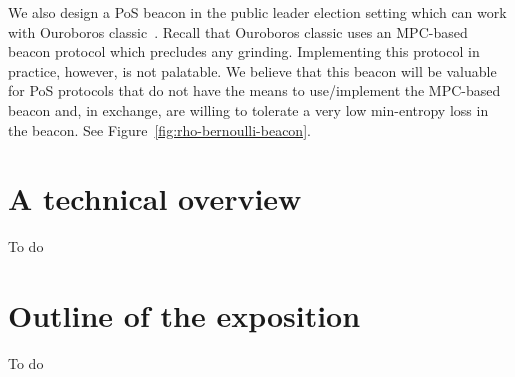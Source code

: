 We also design a PoS beacon in the public leader election setting 
which can work with Ouroboros classic~\cite{Ouroboros}. 
Recall that Ouroboros classic uses an MPC-based beacon protocol 
which precludes any grinding. 
Implementing this protocol in practice, however, is not palatable. 
We believe that this beacon will be valuable for 
PoS protocols 
that do not have the means to use/implement the MPC-based beacon 
and, in exchange, are willing to tolerate a very low min-entropy loss 
in the beacon. 
See Figure~\ref{fig:rho-bernoulli-beacon}.





\section{A technical overview}
To do



\section{Outline of the exposition}
To do





